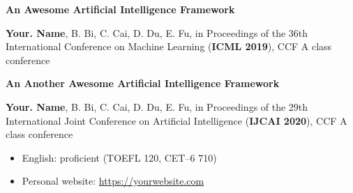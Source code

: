 \documentclass[10pt, a4paper]{article}
\begin{document}
    \textbf{An Awesome Artificial Intelligence Framework}
    
    \textbf{Your. Name}, B. Bi, C. Cai, D. Du, E. Fu, in Proceedings of the 36th International Conference on Machine Learning (\textbf{ICML 2019}), CCF A class conference
    
    \mydelimiter
    
    \textbf{An Another Awesome Artificial Intelligence Framework}
    
    \textbf{Your. Name}, B. Bi, C. Cai, D. Du, E. Fu, in Proceedings of the 29th International Joint Conference on Artificial Intelligence (\textbf{IJCAI 2020}), CCF A class conference
    
    \mydelimiter
    
    
    \begin{itemize}[leftmargin=*, topsep=0pt]
        \item English: proficient (TOEFL 120, CET--6 710)
        \item Personal website: \href{https://yourwebsite.com}{\courierprime\fontsize{10}{12}\selectfont https://yourwebsite.com}
    \end{itemize}
    
\end{document}
